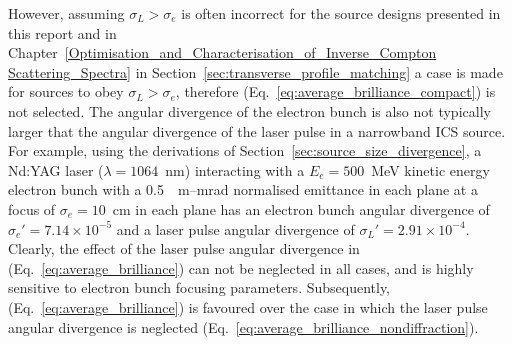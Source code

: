 \documentclass[../main.tex]{subfiles}
\begin{document}
However, assuming $\sigma_{L}>\sigma_{e}$ is often incorrect for the source designs presented in this report and in Chapter~\ref{Optimisation_and_Characterisation_of_Inverse_Compton Scattering_Spectra} in Section~\ref{sec:transverse_profile_matching} a case is made for sources to obey $\sigma_{L}>\sigma_{e}$, therefore (Eq.~\ref{eq:average_brilliance_compact}) is not selected. The angular divergence of the electron bunch is also not typically larger that the angular divergence of the laser pulse in a narrowband ICS source. For example, using the derivations of Section~\ref{sec:source_size_divergence}, a Nd:YAG laser ($\lambda = 1064$~\si{\nano\meter}) interacting with a $E_{e} = 500$~\si{\mega\electronvolt} kinetic energy electron bunch with a 0.5~\si{\mill\meter}--\si{\milli\radian} normalised emittance in each plane at a focus of $\sigma_{e} = 10$~\si{\centi\meter} in each plane has an electron bunch angular divergence of $\sigma_{e}' = 7.14\times10^{-5}$ and a laser pulse angular divergence of $\sigma_{L}' = 2.91\times 10^{-4}$. Clearly, the effect of the laser pulse angular divergence in (Eq.~\ref{eq:average_brilliance}) can not be neglected in all cases, and is highly sensitive to electron bunch focusing parameters. Subsequently, (Eq.~\ref{eq:average_brilliance}) is favoured over the case in which the laser pulse angular divergence is neglected (Eq.~\ref{eq:average_brilliance_nondiffraction}).  
\end{document}
